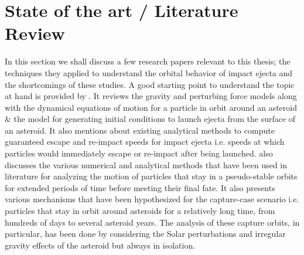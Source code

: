 \section{State of the art / Literature Review}
\label{sec:literature_review}
In this section we shall discuss a few research papers relevant to this thesis; the techniques they applied to understand the orbital behavior of impact ejecta and the shortcomings of these studies.
%
\newline\newline
%
A good starting point to understand the topic at hand is provided by \cite{scheeres2002fate}. It reviews the gravity and perturbing force models along with the dynamical equations of motion for a particle in orbit around an asteroid \& the model for generating initial conditions to launch ejecta from the surface of an asteroid. It also mentions about existing analytical methods to compute guaranteed escape and re-impact speeds for impact ejecta i.e. speeds at which particles would immediately escape or re-impact after being launched. \cite{scheeres2002fate} also discusses the various numerical and analytical methods that have been used in literature for analyzing the motion of particles that stay in a pseudo-stable orbits for extended periods of time before meeting their final fate. It also presents various mechanisms that have been hypothesized for the capture-case scenario i.e. particles that stay in orbit around asteroids for a relatively long time, from hundreds of days to several asteroid years. The analysis of these capture orbits, in particular, has been done by considering the Solar perturbations and irregular gravity effects of the asteroid but always in isolation.

